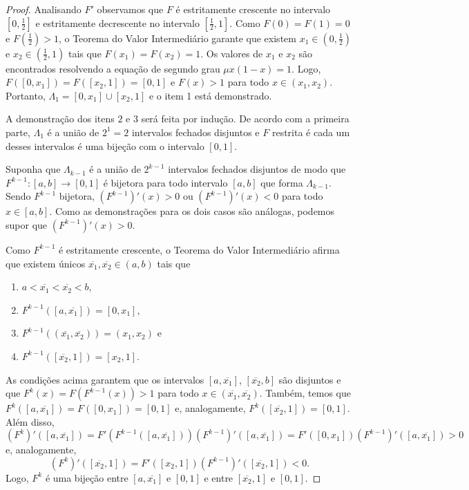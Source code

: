 \begin{proof}
Analisando $F'$ observamos que $F$ é estritamente crescente no intervalo $\left[0, \frac{1}{2}\right]$ e estritamente decrescente no intervalo $\left[\frac{1}{2}, 1\right]$. Como $F(0) = F(1) = 0$ e $F\left(\frac{1}{2}\right) > 1$, o Teorema do Valor Intermediário garante que existem $x_1 \in \left(0, \frac{1}{2}\right)$ e $x_2 \in \left(\frac{1}{2}, 1\right)$ tais que $F(x_1) = F(x_2) = 1$. Os valores de $x_1$ e $x_2$ são encontrados resolvendo a equação de segundo grau $\mu x(1-x) = 1$. Logo, $F([0, x_1]) = F([x_2, 1]) = [0, 1]$ e $F(x) > 1$ para todo $x \in (x_1, x_2)$. Portanto, $\Lambda_1 = [0, x_1] \cup [x_2, 1]$ e o item 1 está demonstrado.

A demonstração dos itens $2$ e $3$ será feita por indução. De acordo com a primeira parte, $\Lambda_1$ é a união de $2^1 = 2$ intervalos fechados disjuntos e $F$ restrita é cada um desses intervalos é uma bijeção com o intervalo $[0,1]$.

Suponha que $\Lambda_{k-1}$ é a união de $2^{k-1}$ intervalos fechados disjuntos de modo que $F^{k-1}: [a, b] \to [0, 1]$ é bijetora para todo intervalo $[a, b]$ que forma $\Lambda_{k-1}$. Sendo $F^{k-1}$ bijetora, $(F^{k-1})'(x) > 0$ ou $(F^{k-1})'(x) < 0$ para todo $x \in [a, b]$. Como as demonstrações para os dois casos são análogas, podemos supor que $(F^{k-1})'(x) > 0$.

Como $F^{k-1}$ é estritamente crescente, o Teorema do Valor Intermediário afirma que existem únicos $\overline{x_1}, \overline{x_2} \in (a, b)$ tais que
\begin{enumerate}[label=(\alph*)]
\item$a < \overline{x_1} < \overline{x_2} < b$,
\item$F^{k-1}([a, \overline{x_1}]) = [0, x_1]$,
\item$F^{k-1}((\overline{x_1}, \overline{x_2})) = (x_1, x_2)$ e
\item$F^{k-1}([\overline{x_2}, 1]) = [x_2, 1]$.
\end{enumerate}

As condições acima garantem que os intervalos $[a, \overline{x_1}]$, $[\overline{x_2}, b]$ são disjuntos e que $F^k(x) = F(F^{k-1}(x)) > 1$ para todo $x \in (\overline{x_1}, \overline{x_2})$. Também, temos que $F^k([a, \overline{x_1}]) = F([0, x_1]) = [0, 1]$ e, analogamente, $F^k([\overline{x_2}, 1]) = [0, 1]$. Além disso, $$(F^k)'([a, \overline{x_1}]) = F'(F^{k-1}([a, \overline{x_1}]))(F^{k-1})'([a, \overline{x_1}]) = F'([0, x_1])(F^{k-1})'([a, \overline{x_1}]) > 0$$ e, analogamente, $$(F^k)'([\overline{x_2}, 1]) = F'([x_2, 1])(F^{k-1})'([\overline{x_2}, 1]) < 0.$$ Logo, $F^k$ é uma bijeção entre $[a, \overline{x_1}]$ e $[0, 1]$ e entre $[\overline{x_2}, 1]$ e $[0, 1]$.


\end{proof}
